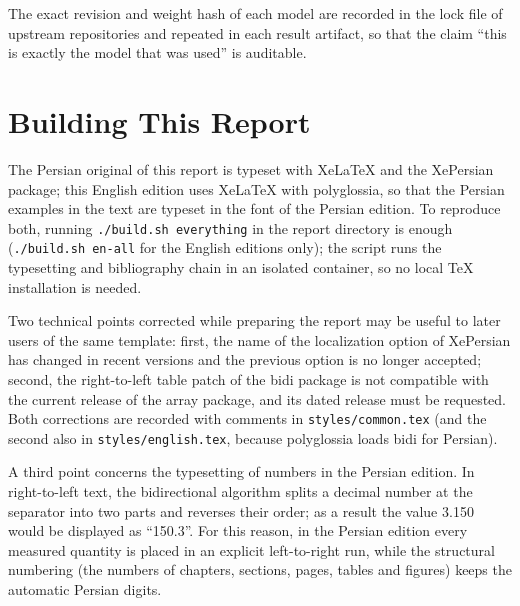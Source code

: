 The exact revision and weight hash of each model are recorded in the lock file of upstream
repositories and repeated in each result artifact, so that the claim ``this is exactly the model that
was used'' is auditable.

\section{Building This Report}
\label{sec:appendix-build}

The Persian original of this report is typeset with XeLaTeX and the XePersian package; this English
edition uses XeLaTeX with polyglossia, so that the Persian examples in the text are typeset in the
font of the Persian edition. To reproduce both, running \texttt{./build.sh everything} in the report
directory is enough (\texttt{./build.sh en-all} for the English editions only); the script runs the
typesetting and bibliography chain in an isolated container, so no local TeX installation is needed.

Two technical points corrected while preparing the report may be useful to later users of the same
template: first, the name of the localization option of XePersian has changed in recent versions and
the previous option is no longer accepted; second, the right-to-left table patch of the bidi package
is not compatible with the current release of the array package, and its dated release must be
requested. Both corrections are recorded with comments in \texttt{styles/common.tex} (and the second
also in \texttt{styles/english.tex}, because polyglossia loads bidi for Persian).

A third point concerns the typesetting of numbers in the Persian edition. In right-to-left text, the
bidirectional algorithm splits a decimal number at the separator into two parts and reverses their
order; as a result the value 3.150 would be displayed as ``150.3''. For this reason, in the Persian
edition every measured quantity is placed in an explicit left-to-right run, while the structural
numbering (the numbers of chapters, sections, pages, tables and figures) keeps the automatic
Persian digits.

